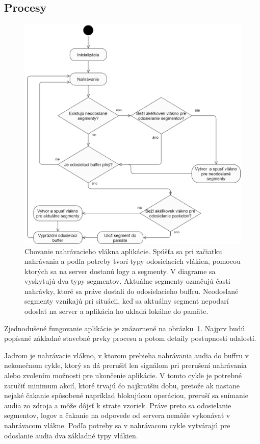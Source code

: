 \subsection{Procesy}
\label{recording-and-sending}
\FloatBarrier
\begin{figure}[!hbt]
	\centering
	\includegraphics[width=1\textwidth]{obrazky-figures/main-recording-process.png}
	\caption{Chovanie nahrávacieho vlákna aplikácie. Spúšťa sa pri začiatku nahrávania a podľa potreby tvorí typy odosielacích vlákien, pomocou ktorých sa na server dostanú logy a segmenty. V diagrame sa vyskytujú dva typy segmentov. Aktuálne segmenty označujú časti nahrávky, ktoré sa práve dostali do odosielacieho buffru. Neodoslané segmenty vznikajú pri situácii, keď sa aktuálny segment nepodarí odoslať na server a aplikácia ho ukladá lokálne do pamäte.}
	\label{main-recording-process}
\end{figure}
\FloatBarrier

Zjednodušené fungovanie aplikácie je znázornené na obrázku~\ref{main-recording-process}. Najprv budú popísané základné stavebné prvky procesu a potom detaily postupnosti udalostí. 

Jadrom je nahrávacie vlákno, v ktorom prebieha nahrávania audia do buffru v nekonečnom cykle, ktorý sa dá prerušiť len signálom pri prerušení nahrávania alebo zvolením možnosti pre ukončenie aplikácie. V tomto cykle je potrebné zaručiť minimum akcií, ktoré trvajú čo najkratšiu dobu, pretože ak nastane nejaké čakanie spôsobené napríklad blokujúcou operáciou, preruší sa snímanie audia zo zdroja a môže dôjsť k strate vzoriek. Práve preto sa odosielanie segmentov, logov a čakanie na odpovede od servera nemôže vykonávať v nahrávacom vlákne. Podľa potreby sa v nahrávacom cykle vytvárajú pre odoslanie audia dva základné typy vlákien.

